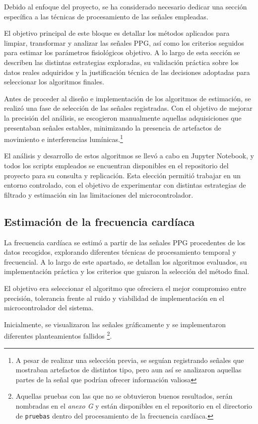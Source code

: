 Debido al enfoque del proyecto, se ha considerado necesario dedicar una sección específica a las técnicas de procesamiento de las señales empleadas.

El objetivo principal de este bloque es detallar los métodos aplicados para limpiar, transformar y analizar las señales PPG, así como los criterios seguidos para estimar los parámetros fisiológicos objetivo. A lo largo de esta sección se describen las distintas estrategias exploradas, su validación práctica sobre los datos reales adquiridos y la justificación técnica de las decisiones adoptadas para seleccionar los algoritmos finales.


Antes de proceder al diseño e implementación de los algoritmos de estimación, se realizó una fase de selección de las señales registradas. Con el objetivo de mejorar la precisión del análisis, se escogieron manualmente aquellas adquisiciones que presentaban señales estables, minimizando la presencia de artefactos de movimiento e interferencias lumínicas.\footnote{A pesar de realizar una selección previa, se seguían registrando señales que mostraban artefactos de distintos tipo, pero aun así se analizaron aquellas partes de la señal que podrían ofrecer información valiosa}

El análisis y desarrollo de estos algoritmos se llevó a cabo en Jupyter Notebook, y todos los scripts empleados se encuentran disponibles en el repositorio del proyecto para su consulta y replicación. Esta elección permitió trabajar en un entorno controlado, con el objetivo de experimentar con distintas estrategias de filtrado y estimación sin las limitaciones del microcontrolador.  

\subsection{Estimación de la frecuencia cardíaca}

La frecuencia cardíaca se estimó a partir de las señales PPG procedentes de los datos recogidos, explorando diferentes técnicas de procesamiento temporal y frecuencial. A lo largo de este apartado, se detallan los algoritmos evaluados, su implementación práctica y los criterios que guiaron la selección del método final.

El objetivo era seleccionar el algoritmo que ofreciera el mejor compromiso entre precisión, tolerancia frente al ruido y viabilidad de implementación en el microcontrolador del sistema.

Inicialmente, se visualizaron las señales gráficamente y se implementaron diferentes planteamientos fallidos \footnote{Aquellas pruebas con las que no se obtuvieron buenos resultados, serán nombradas en el \textit{anexo G} y están disponibles en el repositorio en el directorio de \texttt{pruebas} dentro del procesamiento de la frecuencia cardíaca.}.

